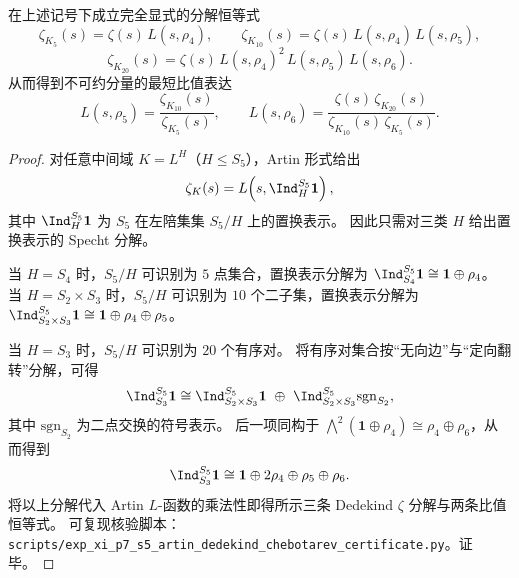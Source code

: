 \begin{theorem}\label{thm:xi-p7-s5-minimal-artin-dedekind-zeta-factorization}
在上述记号下成立完全显式的分解恒等式
\[
\zeta_{K_{5}}(s)=\zeta(s)\,L(s,\rho_4),
\qquad
\zeta_{K_{10}}(s)=\zeta(s)\,L(s,\rho_4)\,L(s,\rho_5),
\]
\[
\zeta_{K_{20}}(s)=\zeta(s)\,L(s,\rho_4)^{2}\,L(s,\rho_5)\,L(s,\rho_6).
\]
从而得到不可约分量的最短比值表达
\[
L(s,\rho_5)=\frac{\zeta_{K_{10}}(s)}{\zeta_{K_{5}}(s)},
\qquad
L(s,\rho_6)=\frac{\zeta(s)\,\zeta_{K_{20}}(s)}{\zeta_{K_{10}}(s)\,\zeta_{K_{5}}(s)}.
\]
\end{theorem}
\begin{proof}
对任意中间域 \(K=L^H\)（\(H\le S_5\)），Artin 形式给出
\[
\zeta_K(s)=L\!\left(s,\Ind_{H}^{S_5}\mathbf 1\right),
\]
其中 \(\Ind_{H}^{S_5}\mathbf 1\) 为 \(S_5\) 在左陪集集 \(S_5/H\) 上的置换表示。
因此只需对三类 \(H\) 给出置换表示的 Specht 分解。
\par
当 \(H=S_4\) 时，\(S_5/H\) 可识别为 \(5\) 点集合，置换表示分解为
\(
\Ind_{S_4}^{S_5}\mathbf 1\cong \mathbf 1\oplus \rho_4
\)。
当 \(H=S_2\times S_3\) 时，\(S_5/H\) 可识别为 \(10\) 个二子集，置换表示分解为
\(
\Ind_{S_2\times S_3}^{S_5}\mathbf 1\cong \mathbf 1\oplus \rho_4\oplus \rho_5
\)。
\par
当 \(H=S_3\) 时，\(S_5/H\) 可识别为 \(20\) 个有序对。
将有序对集合按“无向边”与“定向翻转”分解，可得
\[
\Ind_{S_3}^{S_5}\mathbf 1
\cong
\Ind_{S_2\times S_3}^{S_5}\mathbf 1\ \oplus\ \Ind_{S_2\times S_3}^{S_5}\mathrm{sgn}_{S_2},
\]
其中 \(\mathrm{sgn}_{S_2}\) 为二点交换的符号表示。
后一项同构于 \(\bigwedge^2(\mathbf 1\oplus \rho_4)\cong \rho_4\oplus \rho_6\)，从而得到
\[
\Ind_{S_3}^{S_5}\mathbf 1\cong \mathbf 1\oplus 2\rho_4\oplus \rho_5\oplus \rho_6.
\]
将以上分解代入 Artin \(L\)-函数的乘法性即得所示三条 Dedekind \(\zeta\) 分解与两条比值恒等式。
可复现核验脚本：\texttt{scripts/exp\_xi\_p7\_s5\_artin\_dedekind\_chebotarev\_certificate.py}。证毕。
\end{proof}

